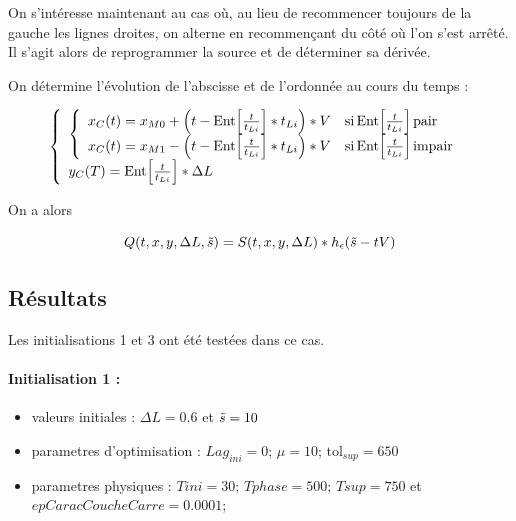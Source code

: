 \documentclass[11pt,a4paper]{article}
\begin{document}
On s'intéresse maintenant au cas où, au lieu de recommencer toujours de la gauche les lignes droites, on alterne en recommençant du côté où l'on s'est arrêté. Il s'agit alors de reprogrammer la source et de déterminer sa dérivée. 


On détermine l'évolution de l'abscisse et de l'ordonnée au cours du temps :

\begin{equation}
\left\{
\begin{array}{l}
\left\{\begin{array}{ll}
x_C(t)=x_{M0}+\Big(t-\textrm{Ent}\Big[\frac{t}{t_{Li}}\Big]*t_{Li}\Big)*V & \textrm{si\,}\textrm{Ent}\Big[\frac{t}{t_{Li}}\Big]\textrm{\,pair} \\
x_C(t)=x_{M1}-\Big(t-\textrm{Ent}\Big[\frac{t}{t_{Li}}\Big]*t_{Li}\Big)*V & \textrm{si\,}\textrm{Ent}\Big[\frac{t}{t_{Li}}\Big]\textrm{\,impair}
\end{array}
\right. \\
y_C(T)=\textrm{Ent}\Big[\frac{t}{t_{Li}}\Big]*\Delta L
\end{array}
\right. 
\end{equation}


On a alors 

\begin{equation}
Q(t,x,y,\Delta L,\tilde{s})=S(t,x,y,\Delta L)*h_{\epsilon}(\tilde{s}-tV)
\end{equation}  

\subsection*{Résultats}
\newcommand\FichierALMCh{/Users/mathilde/These/Projets/OptimisationTrajectoire/LignesDroites/NbLignesNonFixe/LignesEquidistantes/deuxVariables/SansAdjoint/RectangleChangementSens/AugmentedLagrangian/ResultatsTests/tout/}

Les initialisations 1 et 3 ont été testées dans ce cas.

\paragraph{Initialisation 1 :}

\begin{itemize}
	\item valeurs initiales : $\Delta L=0.6$ et $\tilde{s}=10$
	\item parametres d'optimisation : $Lag_{ini}=0$; $\mu=10$; $\textrm{tol}_{sup}=650$
	\item parametres physiques : $Tini=30;\,Tphase=500;\,Tsup=750$ et $epCaracCoucheCarre=0.0001;$
\end{itemize}
\end{document}
